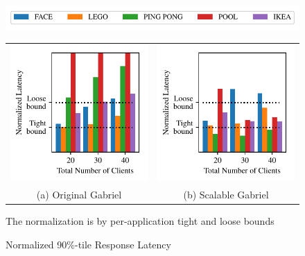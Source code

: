 \begin{figure}
	\begin{center}
		\includegraphics[width=\linewidth]{FIGS/fig-alloc-latency-legend.pdf}
								
		\begin{tabular}{c@{}c}
			\includegraphics[width=.5\linewidth]{FIGS/fig-eval-latency-baseline.pdf}
			            & \includegraphics[width=.5\linewidth]{FIGS/fig-eval-latency-cpushares.pdf} \\
			{\small (a) Original  Gabriel} & {\small (b) Scalable Gabriel}                                                    
		\end{tabular}
	\end{center}

\begin{captiontext}
The normalization is by per-application tight and loose bounds~\cite{Chen2017}
\end{captiontext}
\vspace{-0.1in}
	\caption{\small Normalized 90\%-tile Response Latency}
	\label{fig:frame-latency}
\end{figure}


